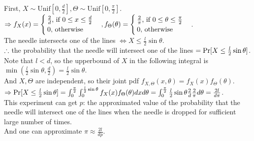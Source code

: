 \begin{pr}
First, $X\sim\mathrm{Unif}[0, \frac d2], \Theta\sim\mathrm{Unif}[0, \frac\pi2]$.\\
$\then f_X(x)=\begin{cases}
\frac2d\text{, if }0\leq x\leq\frac d2\\
0\text{, otherwise}
\end{cases}, f_\Theta(\theta)=\begin{cases}
\frac2\pi\text{, if }0\leq\theta\leq\frac\pi2\\
0\text{, otherwise}
\end{cases}$.\\
The needle intersects one of the lines $\iff X\leq\frac l2\sin\theta$.\\
$\so$ the probability that the needle will intersect one of the lines $=\P[X\leq\frac l2\sin\theta]$.\\
Note that $l<d$, so the upperbound of $X$ in the following integral is $\min(\frac l2\sin\theta, \frac d2)=\frac l2\sin\theta$.\\
And $X, \Theta$ are independent, so their joint pdf $f_{X, \Theta}(x, \theta)=f_X(x)f_\Theta(\theta)$.\\
$\then\P[X\leq\frac l2\sin\theta]=\int_0^{\frac\pi2}\int_0^{\frac l2\sin\theta}f_X(x)f_\Theta(\theta)dxd\theta=\int_0^{\frac\pi2}\frac l2\sin\theta\frac2d\frac2\pi d\theta=\frac{2l}{d\pi}$.\\
This experiment can get $p$: the approximated value of the probability that the needle will intersect one of the lines when the needle is dropped for sufficient large number of times.\\
And one can approximate $\pi\approx\frac{2l}{dp}$.
\end{pr}
